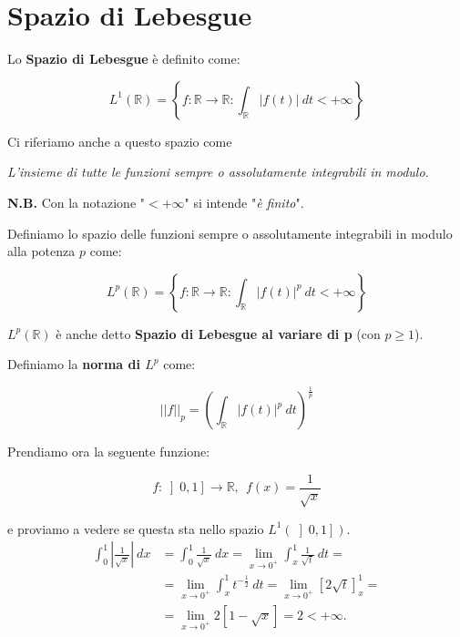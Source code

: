 \section{Spazio di Lebesgue}
\begin{definition}
    Lo \textbf{Spazio di Lebesgue} è definito come:
    
    $$
        L^1(\mathbb{R}) = \left \{ f: \mathbb{R} \rightarrow \mathbb{R} : \int_\mathbb{R} |f(t)| \ dt < +\infty \right \}
    $$
\end{definition}

Ci riferiamo anche a questo spazio come
\begin{center}
    \textit{L'insieme di tutte le funzioni sempre o assolutamente integrabili in
        modulo}.
\end{center}

\textbf{N.B.} Con la notazione "$< +\infty$" si intende "\textit{è finito}".
\begin{definition}
    Definiamo lo spazio delle funzioni sempre o assolutamente integrabili in
    modulo alla potenza $p$ come:
    
    $$
        L^p(\mathbb{R}) = \left \{ f: \mathbb{R} \rightarrow \mathbb{R} : \int_\mathbb{R} |f(t)|^p \ dt < +\infty \right \}
    $$
    
    $L^p (\mathbb{R})$ è anche detto \textbf{Spazio di Lebesgue al variare di p}
    (con $p \ge 1$).
\end{definition}

\begin{definition}
    Definiamo la \textbf{norma di $L^p$} come:
    
    $$
        ||f||_p = \left( \int_{\mathbb{R}} |f(t)|^p \ dt \right)^{\frac{1}{p}}
    $$
\end{definition}

Prendiamo ora la seguente funzione:

$$
    f : \left] 0, 1 \right] \rightarrow \mathbb{R}, \ \ f(x) = \frac{1}{\sqrt{x}}
$$

e proviamo a vedere se questa sta nello spazio $L^1(\left] 0, 1 \right])$.
\begin{equation}
    \begin{aligned}
        \int_{0}^{1} |\frac{1}{\sqrt{x}}| \ dx & = \int_{0}^{1} \frac{1}{\sqrt{x}} \ dx = \lim_{x \rightarrow 0^+} \int_{x}^{1} \frac{1}{\sqrt{t}} \ dt =          \\
                                               & = \lim_{x \rightarrow 0^+} \int_{x}^{1} t^{-\frac{1}{2}} \ dt = \lim_{x \rightarrow 0^+} [ 2 \sqrt{t} ]_{x}^{1} = \\
                                               & = \lim_{x \rightarrow 0^+} 2 [1 - \sqrt{x}] = 2 < +\infty.
    \end{aligned}
\end{equation}

